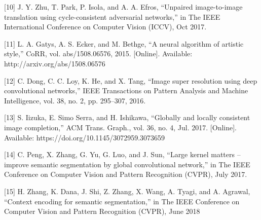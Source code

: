 \documentclass[journal]{IEEEtran} %
\begin{document}
[10] J. Y. Zhu, T. Park, P. Isola, and A. A. Efros, “Unpaired
image-to-image translation using cycle-consistent adversarial
networks,” in The IEEE International Conference on Computer
Vision (ICCV), Oct 2017.

[11] L. A. Gatys, A. S. Ecker, and M. Bethge, “A neural algorithm
of artistic style,” CoRR, vol. abs/1508.06576, 2015. [Online].
Available: http://arxiv.org/abs/1508.06576

[12] C. Dong, C. C. Loy, K. He, and X. Tang, “Image super resolution using deep convolutional networks,” IEEE Transactions on Pattern Analysis and Machine Intelligence, vol. 38,
no. 2, pp. 295–307, 2016.

[13] S. Iizuka, E. Simo Serra, and H. Ishikawa, “Globally
and locally consistent image completion,” ACM Trans.
Graph., vol. 36, no. 4, Jul. 2017. [Online]. Available:
https://doi.org/10.1145/3072959.3073659

[14] C. Peng, X. Zhang, G. Yu, G. Luo, and J. Sun, “Large kernel
matters – improve semantic segmentation by global convolutional network,” in The IEEE Conference on Computer Vision
and Pattern Recognition (CVPR), July 2017.

[15] H. Zhang, K. Dana, J. Shi, Z. Zhang, X. Wang, A. Tyagi, and
A. Agrawal, “Context encoding for semantic segmentation,”
in The IEEE Conference on Computer Vision and Pattern
Recognition (CVPR), June 2018
\end{document}
